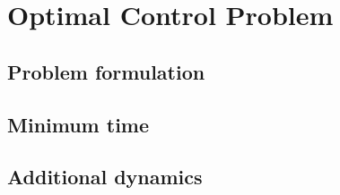 \chapter{Optimal Control Problem}
\label{Ch:OCP}
%
\section{Problem formulation}
%
\section{Minimum time}
%
\section{Additional dynamics}
%